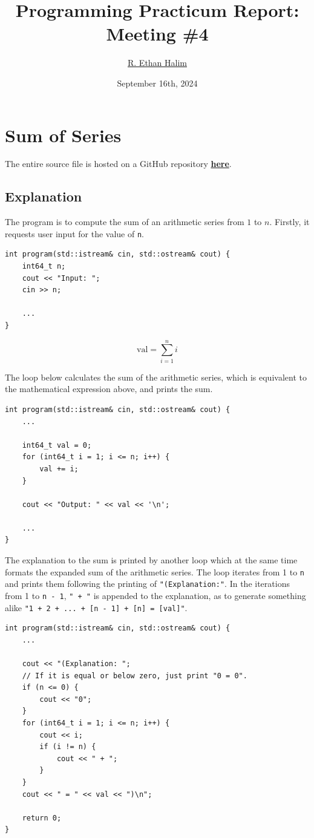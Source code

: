 \documentclass[12pt]{article}
\title{Programming Practicum Report:\\Meeting \#4}
\author{\href{https://github.com/avaxar}{R. Ethan Halim}}
\date{September 16th, 2024}
\begin{document}
\maketitle

\section{Sum of Series}
The entire source file is hosted on a GitHub repository \href{https://github.com/avaxar/uni-practica-1/tree/main/week_4/01_sum}{\textbf{here}}.

\subsection{Explanation}

The program is to compute the sum of an arithmetic series from $1$ to $n$. Firstly, it requests user input for the value of \texttt{n}.

\begin{verbatim}
int program(std::istream& cin, std::ostream& cout) {
    int64_t n;
    cout << "Input: ";
    cin >> n;

    ...
}
\end{verbatim}

$$\text{val} = \sum_{i = 1}^n i$$

The loop below calculates the sum of the arithmetic series, which is equivalent to the mathematical expression above, and prints the sum.

\begin{verbatim}
int program(std::istream& cin, std::ostream& cout) {
    ...

    int64_t val = 0;
    for (int64_t i = 1; i <= n; i++) {
        val += i;
    }

    cout << "Output: " << val << '\n';

    ...
}
\end{verbatim}

The explanation to the sum is printed by another loop which at the same time formats the expanded sum of the arithmetic series. The loop iterates from 1 to \texttt{n} and prints them following the printing of \texttt{"(Explanation:"}. In the iterations from 1 to \texttt{n - 1}, \texttt{" + "} is appended to the explanation, as to generate something alike \texttt{"1 + 2 + ... + [n - 1] + [n] = [val]"}.

\begin{verbatim}
int program(std::istream& cin, std::ostream& cout) {
    ...

    cout << "(Explanation: ";
    // If it is equal or below zero, just print "0 = 0".
    if (n <= 0) {
        cout << "0";
    }
    for (int64_t i = 1; i <= n; i++) {
        cout << i;
        if (i != n) {
            cout << " + ";
        }
    }
    cout << " = " << val << ")\n";

    return 0;
}
\end{verbatim}
\end{document}
